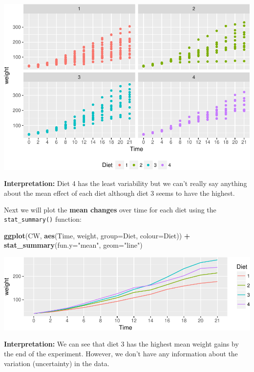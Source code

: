 \documentclass[]{book}
\newenvironment{Shaded}{\begin{snugshade}}{\end{snugshade}}
\newcommand{\DataTypeTok}[1]{\textcolor[rgb]{0.13,0.29,0.53}{#1}}
\newcommand{\KeywordTok}[1]{\textcolor[rgb]{0.13,0.29,0.53}{\textbf{#1}}}
\newcommand{\NormalTok}[1]{#1}
\newcommand{\OperatorTok}[1]{\textcolor[rgb]{0.81,0.36,0.00}{\textbf{#1}}}
\newcommand{\StringTok}[1]{\textcolor[rgb]{0.31,0.60,0.02}{#1}}
\theoremstyle{definition}
\theoremstyle{definition}
\theoremstyle{definition}
\theoremstyle{remark}
\begin{document}
\includegraphics{01-Introduction-to-R_files/figure-latex/ScatterPlot-1.pdf}

\textbf{Interpretation:} Diet 4 has the least variability but we can't really say anything about the mean effect
of each diet although diet 3 seems to have the highest.

Next we will plot the \textbf{mean changes} over time for each diet using the \texttt{stat\_summary()} function:

\begin{Shaded}
\begin{Highlighting}[]
\KeywordTok{ggplot}\NormalTok{(CW, }\KeywordTok{aes}\NormalTok{(Time, weight, }
               \DataTypeTok{group=}\NormalTok{Diet, }\DataTypeTok{colour=}\NormalTok{Diet)) }\OperatorTok{+}
\StringTok{  }\KeywordTok{stat_summary}\NormalTok{(}\DataTypeTok{fun.y=}\StringTok{"mean"}\NormalTok{, }\DataTypeTok{geom=}\StringTok{"line"}\NormalTok{) }
\end{Highlighting}
\end{Shaded}

\includegraphics{01-Introduction-to-R_files/figure-latex/meanlinesPlot-1.pdf}

\textbf{Interpretation:}
We can see that diet 3 has the highest mean weight gains by the end of the experiment. However,
we don't have any information about the variation (uncertainty) in the data.
\end{document}
